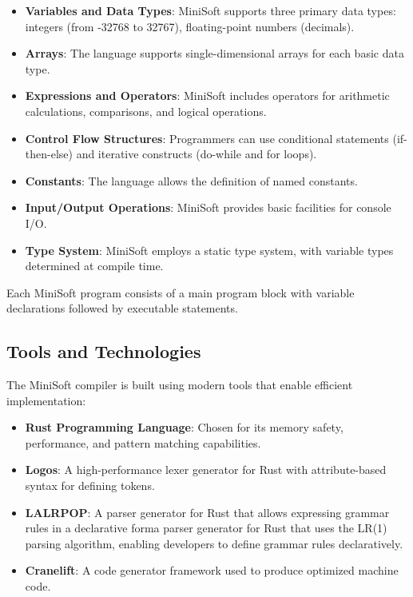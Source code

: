 \documentclass[12pt,a4paper]{article}
\begin{document}
\begin{itemize}
	\item \textbf{Variables and Data Types}: MiniSoft supports three primary data types: integers (from -32768 to 32767), floating-point numbers (decimals).

	\item \textbf{Arrays}: The language supports single-dimensional arrays for each basic data type.

	\item \textbf{Expressions and Operators}: MiniSoft includes operators for arithmetic calculations, comparisons, and logical operations.

	\item \textbf{Control Flow Structures}: Programmers can use conditional statements (if-then-else) and iterative constructs (do-while and for loops).

	\item \textbf{Constants}: The language allows the definition of named constants.

	\item \textbf{Input/Output Operations}: MiniSoft provides basic facilities for console I/O.

	\item \textbf{Type System}: MiniSoft employs a static type system, with variable types determined at compile time.
\end{itemize}

Each MiniSoft program consists of a main program block with variable declarations followed by executable statements.

\subsection{Tools and Technologies}
The MiniSoft compiler is built using modern tools that enable efficient implementation:

\begin{itemize}
	\item \textbf{Rust Programming Language}: Chosen for its memory safety, performance, and pattern matching capabilities.
    
	\item \textbf{Logos}: A high-performance lexer generator for Rust with attribute-based syntax for defining tokens.
    
	\item \textbf{LALRPOP}: A parser generator for Rust that allows expressing grammar rules in a declarative forma parser generator for Rust that uses the LR(1) parsing algorithm, enabling developers to define grammar rules declaratively.

	\item \textbf{Cranelift}: A code generator framework used to produce optimized machine code.
\end{itemize}
\end{document}
